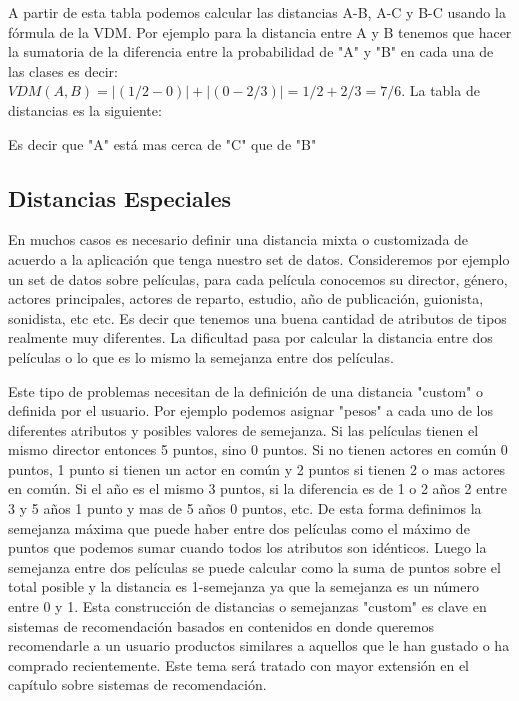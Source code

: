 A partir de esta tabla podemos calcular las distancias A-B, A-C y B-C usando la fórmula de la VDM. Por ejemplo para la distancia entre A y B tenemos que hacer la sumatoria de la diferencia entre la probabilidad de "A" y "B" en cada una de las clases es decir: $VDM(A,B) = |(1/2-0)| + |(0-2/3)| = 1/2 + 2/3 = 7/6$. La tabla de distancias es la siguiente:

\begin{table}[!hbt]
\vskip 0.25cm
\caption{Ejemplo distancia VDM.}
\end{table}

Es decir que "A" está mas cerca de "C" que de "B" 

\subsection{Distancias Especiales}

En muchos casos es necesario definir una distancia mixta o customizada de acuerdo a la aplicación que tenga nuestro set de datos. Consideremos por ejemplo un set de datos sobre películas, para cada película conocemos su director, género, actores principales, actores de reparto, estudio, año de publicación, guionista, sonidista, etc etc. Es decir que tenemos una buena cantidad de atributos de tipos realmente muy diferentes. La dificultad pasa por calcular la distancia entre dos películas o lo que es lo mismo la semejanza entre dos películas. 

Este tipo de problemas necesitan de la definición de una distancia "custom" o definida por el usuario. Por ejemplo podemos asignar "pesos" a cada uno de los diferentes atributos y posibles valores de semejanza. Si las películas tienen el mismo director entonces 5 puntos, sino 0 puntos. Si no tienen actores en común 0 puntos, 1 punto si tienen un actor en común y 2 puntos si tienen 2 o mas actores en común. Si el año es el mismo 3 puntos, si la diferencia es de 1 o 2 años 2 entre 3 y 5 años 1 punto y mas de 5 años 0 puntos, etc. De esta forma definimos la semejanza máxima que puede haber entre dos películas como el máximo de puntos que podemos sumar cuando todos los atributos son idénticos. Luego la semejanza entre dos películas se puede calcular como la suma de puntos sobre el total posible y la distancia es 1-semejanza ya que la semejanza es un número entre 0 y 1. Esta construcción de distancias o semejanzas "custom" es clave en sistemas de recomendación basados en contenidos en donde queremos recomendarle a un usuario productos similares a aquellos que le han gustado o ha comprado recientemente. Este tema será tratado con mayor extensión en el capítulo sobre sistemas de recomendación.

